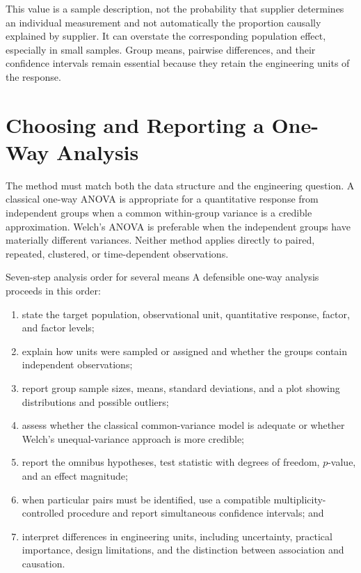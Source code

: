 This value is a sample description, not the probability that supplier determines an individual measurement and not automatically the proportion causally explained by supplier. It can overstate the corresponding population effect, especially in small samples. Group means, pairwise differences, and their confidence intervals remain essential because they retain the engineering units of the response.

\newpage

\section{Choosing and Reporting a One-Way Analysis}
\label{sec:anova-reporting}

The method must match both the data structure and the engineering question. A classical one-way ANOVA is appropriate for a quantitative response from independent groups when a common within-group variance is a credible approximation. Welch's ANOVA is preferable when the independent groups have materially different variances. Neither method applies directly to paired, repeated, clustered, or time-dependent observations.

\begin{custombox}{Seven-step analysis order for several means}
A defensible one-way analysis proceeds in this order:
\begin{enumerate}
  \item state the target population, observational unit, quantitative response, factor, and factor levels;
  \item explain how units were sampled or assigned and whether the groups contain independent observations;
  \item report group sample sizes, means, standard deviations, and a plot showing distributions and possible outliers;
  \item assess whether the classical common-variance model is adequate or whether Welch's unequal-variance approach is more credible;
  \item report the omnibus hypotheses, test statistic with degrees of freedom, $p$-value, and an effect magnitude;
  \item when particular pairs must be identified, use a compatible multiplicity-controlled procedure and report simultaneous confidence intervals; and
  \item interpret differences in engineering units, including uncertainty, practical importance, design limitations, and the distinction between association and causation.
\end{enumerate}
\end{custombox}

